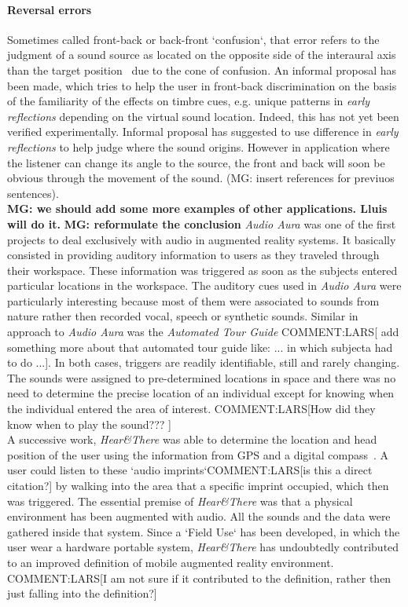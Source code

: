 \documentclass[journal]{IEEEtran}
\begin{document}
\paragraph{Reversal errors}
Sometimes called front-back or back-front `confusion`, that error refers to the judgment of a sound source as located on the opposite side of the interaural axis than the target position~\cite{} due to the cone of confusion. An informal proposal has been made, which tries to help the user in front-back discrimination on the basis of the familiarity of the effects on timbre cues, e.g. unique patterns in \emph{early reflections} depending on the virtual sound location. Indeed, this has not yet been verified experimentally. Informal proposal has suggested to use difference in \emph{early reflections} to help judge where the sound origins. However in application where the listener can change its angle to the source, the front and back will soon be obvious through the movement of the sound. (MG: insert references for previuos sentences).\\

\textbf{MG: we should add some more examples of other applications. Lluis will do it.}
\textbf{MG: reformulate the conclusion} \emph{Audio Aura} \cite{mynatt1997} was one of the first projects to deal exclusively with audio in augmented reality systems. It basically consisted in providing auditory information to users as they traveled through their workspace. These information was triggered as soon as the subjects entered particular locations in the workspace. The auditory cues used in \emph{Audio Aura} were particularly interesting because most of them were associated to sounds from nature rather then recorded vocal, speech or synthetic sounds. Similar in approach to \emph{Audio Aura} was the \emph{Automated Tour Guide} \cite{bederson1995} COMMENT:LARS[ add something more about that automated tour guide like: ... in which subjecta had to do ...]. In both cases, triggers are readily identifiable, still and rarely changing. The sounds were assigned to pre-determined locations in space and there was no need to determine the precise location of an individual except for knowing when the individual entered the area of interest. COMMENT:LARS[How did they know when to play the sound??? ]\\

A successive work, \emph{Hear\&There} was able to determine the location and head position of the user using the information from GPS and a digital compass~\cite{rozier2000}. A user could listen to these `audio imprints`COMMENT:LARS[is this a direct citation?] by walking into the area that a specific imprint occupied, which then was triggered. The essential premise of  \emph{Hear\&There} was that a physical environment has been augmented with audio. All the sounds and the data were gathered inside that system. Since a `Field Use` has been developed, in which the user wear a hardware portable system, \emph{Hear\&There} has undoubtedly contributed to an improved definition of mobile augmented reality environment. COMMENT:LARS[I am not sure if it contributed to the definition, rather then just falling into the definition?]\\
\end{document}
